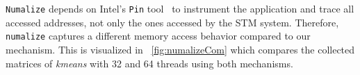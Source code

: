 \texttt{Numalize} depends on Intel's \texttt{Pin} tool~\cite{Luk:2005} to instrument the application and trace all accessed addresses, not only the ones accessed by the STM system. Therefore, \texttt{numalize} captures a different memory access behavior compared to our mechanism. This is visualized in \figurename~\ref{fig:numalizeCom} which compares the collected matrices of \emph{kmeans} with 32 and 64 threads using both mechanisms. %

\begin{figure}[!ht]
	\centering
\end{figure}
